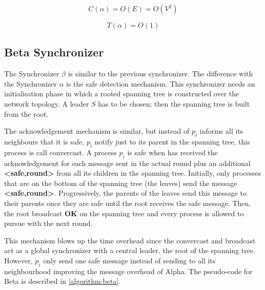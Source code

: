 \begin{equation}
\label{ec:message-alpha}
 C(\alpha) = O(E) = O(V^2) 
\end{equation}

\begin{equation}
\label{ec:time-alpha}
 T(\alpha) = O(1) 
\end{equation}


\subsection{Beta Synchronizer}

The Synchronizer $\beta$ is similar to the previous synchronizer. The difference with the Synchronizer $\alpha$ is the safe detection mechanism. This synchronizer needs an initialisation phase in which a rooted spanning tree is constructed over the network topology. A leader $S$ has to be chosen; then the spanning tree is built from the root. 

The acknowledgement mechanism is similar, but instead of $p_i$ informs all its neighbours that it is safe, $p_i$ notify just to its parent in the spanning tree, this process is call convercast. A process $p_i$ is safe when has received the acknowledgement for each message sent in the actual round plus an additional \textbf{<safe,round>} from all its children in the spanning tree. Initially, only processes that are on the bottom of the spanning tree (the leaves) send the message \textbf{<safe,round>}. Progressively, the parents of the leaves send this message to their parents once they are safe until the root receives the safe message. Then, the root broadcast \textbf{OK} on the spanning tree and every process is allowed to pursue with the next round. 

This mechanism blows up the time overhead since the convercast and broadcast act as a global synchronizer with a central leader, the root of the spanning tree. However, $p_i$ only send one safe message instead of sending to all its neighbourhood improving the message overhead of Alpha. The pseudo-code for Beta is described in \ref{algorithm:beta}.


